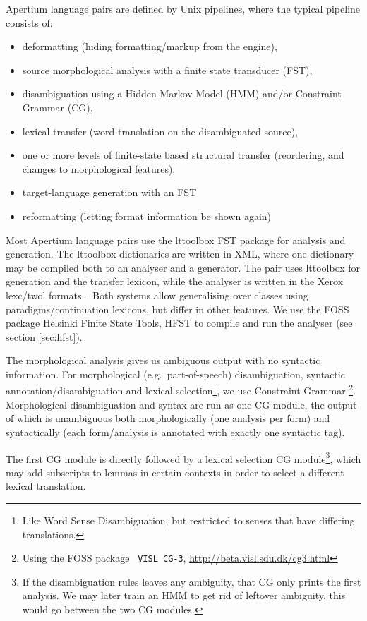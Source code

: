 Apertium language pairs are defined by Unix pipelines, where the
typical pipeline consists of:

\begin{itemize}
\item deformatting (hiding formatting/markup from the engine),
\item source morphological analysis with a finite state transducer
  (FST),
\item disambiguation using a Hidden Markov Model (HMM) and/or
  Constraint Grammar (CG), 
\item lexical transfer (word-translation on the disambiguated source),
\item one or more levels of finite-state based structural transfer
  (reordering, and changes to morphological features),
\item target-language generation with an FST
\item reformatting (letting format information be shown again)
\end{itemize}

Most Apertium language pairs use the lttoolbox FST package for
analysis and generation. The lttoolbox dictionaries are written in
XML, where one dictionary may be compiled both to an analyser and a
generator. The \smenob{} pair uses lttoolbox for \nob{} generation and
the transfer lexicon, while the \sme{} analyser is written in the
Xerox lexc/twol formats~\citep{beesley2003fsm}. Both systems allow
generalising over classes using paradigms/continuation lexicons, but
differ in other features. We use the FOSS package Helsinki Finite
State Tools, HFST \citep{linden2011hfst} to compile and run the
analyser (see section \ref{sec:hfst}).

The morphological analysis gives us ambiguous output with no syntactic
information. For morphological (e.g.~part-of-speech) disambiguation,
syntactic annotation/disambiguation and lexical
selection\footnote{Like Word Sense Disambiguation, but restricted to
  senses that have differing translations.}, we use Constraint Grammar
\citep{karlsson1990cgf}\footnote{Using the FOSS package {\tt \small
    VISL CG-3},
  \href{http://beta.visl.sdu.dk/cg3.html}{http://beta.visl.sdu.dk/cg3.html}}.
Morphological disambiguation and syntax
are run as one CG module, the output of which is unambiguous both
morphologically (one analysis per form) and syntactically (each
form/analysis is annotated with exactly one syntactic tag).

The first CG module is directly followed by a lexical selection CG
module\footnote{If the disambiguation rules leaves any ambiguity, that
  CG only prints the first analysis. We may later train an HMM to get
  rid of leftover ambiguity, this would go between the two CG
  modules.}, which may add subscripts to lemmas in certain contexts in
order to select a different lexical translation.

